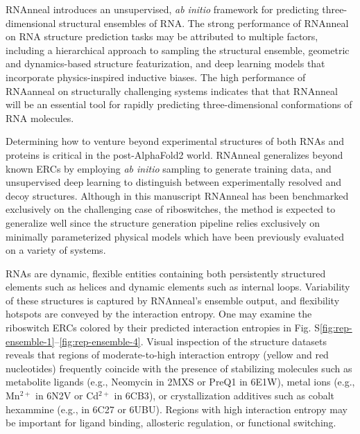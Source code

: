 \documentclass[%
aip,
 amsmath,amssymb,
reprint,%
twocolumn,
]{revtex4-1}
\begin{document}
{RNAnneal introduces an unsupervised, {\it ab initio} framework for predicting three-dimensional structural ensembles of RNA. The strong performance of RNAnneal on RNA structure prediction tasks may be attributed to multiple factors, including a hierarchical approach to sampling the structural ensemble, geometric and dynamics-based structure featurization, and deep learning models that incorporate physics-inspired inductive biases. The high performance of RNAanneal on structurally challenging systems indicates that that RNAnneal will be an essential tool for rapidly predicting three-dimensional conformations of RNA molecules. 

Determining how to venture beyond experimental structures of both RNAs and proteins is critical in the post-AlphaFold2 world. RNAnneal generalizes beyond known ERCs by employing {\it ab initio} sampling to generate training data, and unsupervised deep learning to distinguish between experimentally resolved and decoy structures. Although in this manuscript RNAnneal has been benchmarked exclusively on the challenging case of riboswitches, the method is expected to generalize well since the structure generation pipeline relies exclusively on minimally parameterized physical models which have been previously evaluated on a variety of systems.\cite{watkins2020farfar2,tan2018rna} 

RNAs are dynamic, flexible entities containing both persistently structured elements such as helices and dynamic elements such as internal loops. Variability of these structures is captured by RNAnneal's ensemble output, and flexibility hotspots are conveyed by the interaction entropy. One may examine the riboswitch ERCs colored by their predicted interaction entropies in Fig. S\ref{fig:rep-ensemble-1}–\ref{fig:rep-ensemble-4}. Visual inspection of the structure datasets reveals that regions of moderate-to-high interaction entropy (yellow and red nucleotides) frequently coincide with the presence of stabilizing molecules such as metabolite ligands (e.g., Neomycin in 2MXS\cite{Schmidtke2015} or PreQ1 in 6E1W\cite{Numata2019}), metal ions (e.g., Mn$^{2+}$ in 6N2V\cite{Price2018} or Cd$^{2+}$ in 6CB3\cite{Bachas2018}), or crystallization additives such as cobalt hexammine (e.g., in 6C27\cite{Grigg2018} or 6UBU\cite{Matyjasik2019}). Regions with high interaction entropy may be important for ligand binding, allosteric regulation, or functional switching. 

}
\end{document}
